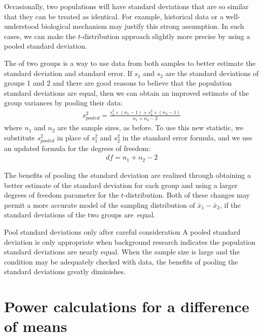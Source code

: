 Occasionally, two populations will have standard deviations that are so similar that they can be treated as identical. For example, historical data or a well-understood biological mechanism may justify this strong assumption. In such cases, we can make the $t$-distribution approach slightly more precise by using a pooled standard deviation.

The  of two groups is a way to use data from both samples to better estimate the standard deviation and standard error. If $s_1^{}$ and $s_2^{}$ are the standard deviations of groups 1 and 2 and there are good reasons to believe that the population standard deviations are equal, then we can obtain an improved estimate of the group variances by pooling their data:
\begin{align*}
s_{pooled}^2 = \frac{s_1^2\times (n_1-1) + s_2^2\times (n_2-1)}{n_1 + n_2 - 2}
\end{align*}
where $n_1$ and $n_2$ are the sample sizes, as before. To use this new statistic, we substitute $s_{pooled}^2$ in place of $s_1^2$ and $s_2^2$ in the standard error formula, and we use an updated formula for the degrees of freedom:
\begin{align*}
df = n_1 + n_2 - 2
\end{align*}

The benefits of pooling the standard deviation are realized through obtaining a better estimate of the standard deviation for each group and using a larger degrees of freedom parameter for the $t$-distribution. Both of these changes may permit a more accurate model of the sampling distribution of $\bar{x}_1 - \bar{x}_2$, if the standard deviations of the two groups are~equal.

\begin{onebox}
    {Pool standard deviations only after careful consideration}
  A pooled standard deviation is only appropriate when
  background research indicates the population standard
  deviations are nearly equal.
  When the sample size is large and the condition
  may be adequately checked with data, the benefits
  of pooling the standard deviations greatly diminishes.
\end{onebox}



\section{Power calculations for a difference of means}
\label{PowerForDifferenceOfTwoMeans}

